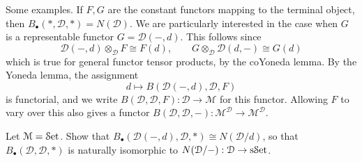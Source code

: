 Some examples. If $F,G$ are the constant functors mapping to the terminal object, then $B_{\bullet} (*,\mathcal{D} ,*)=N(\mathcal{D} )$. We are particularly interested in the case when $G$ is a representable functor $G=\mathcal{D} (-,d)$. This follows since
\[
	\mathcal{D} (-,d)\otimes _\mathcal{D} F\cong F(d),\qquad G\otimes _\mathcal{D} \mathcal{D} (d,-)\cong G(d)
\]
which is true for general functor tensor products, by the coYoneda lemma. By the Yoneda lemma, the assignment
\[
	d\mapsto B(\mathcal{D} (-,d),\mathcal{D} ,F)
\]
is functorial, and we write $B(\mathcal{D} ,\mathcal{D} ,F): \mathcal{D}  \to \mathcal{M} $ for this functor. Allowing $F$ to vary over this also gives a functor $B(\mathcal{D} ,\mathcal{D} ,-): \mathcal{M} ^{\mathcal{D} }  \to \mathcal{M} ^{\mathcal{D} } $.

 \begin{exercise}
 	Let $\mathcal{M} =\mathcal{S}\mathrm{et} $. Show that $B_{\bullet} (\mathcal{D} (-,d),\mathcal{D} ,*)\cong N(\mathcal{D} /d)$, so that $B_{\bullet} (\mathcal{D} ,\mathcal{D} ,*)$ is naturally isomorphic to $N(\mathcal{D} /-): \mathcal{D}  \to \mathrm{s}\mathcal{S}\mathrm{et}$.
 \end{exercise}
